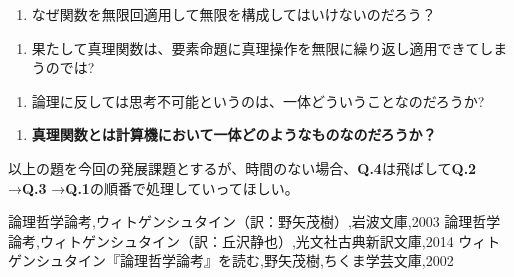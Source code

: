 \documentclass[a4paper,onecolumn,article]{jarticle}
\newcounter{ct}               %
\begin{document}
{\bf
\setcounter{ct}{1}

\begin{enumerate}
  \item なぜ関数を無限回適用して無限を構成してはいけないのだろう？
\end{enumerate}

\begin{enumerate}
  \item 果たして真理関数は、要素命題に真理操作を無限に繰り返し適用できてしまうのでは?
\end{enumerate}

\begin{enumerate}
  \item 論理に反しては思考不可能というのは、一体どういうことなのだろうか?
\end{enumerate}

\begin{enumerate}
  \item {\bf 真理関数とは計算機において一体どのようなものなのだろうか？ }
\end{enumerate}

}
\addtocounter{ct}{-1}
以上の題を今回の発展課題とするが、時間のない場合、{\bf Q.4}は飛ばして{\bf Q.2 }→{\bf Q.3 }→{\bf Q.1}の順番で処理していってほしい。

\begin{thebibliography}{9}
   論理哲学論考,ウィトゲンシュタイン（訳：野矢茂樹）,岩波文庫,2003
   論理哲学論考,ウィトゲンシュタイン（訳：丘沢静也）,光文社古典新訳文庫,2014
   ウィトゲンシュタイン『論理哲学論考』を読む,野矢茂樹,ちくま学芸文庫,2002
\end{thebibliography}
\end{document}
